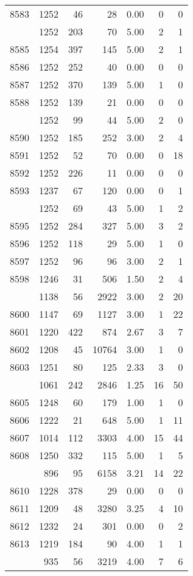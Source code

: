 \documentclass[
]{article}
\begin{document}
\begin{table}
\begin{tabular}[t]{lrrrrrr}
8583 & 1252 & 46 & 28 & 0.00 & 0 & 0\\
\addlinespace
8584 & 1252 & 203 & 70 & 5.00 & 2 & 1\\
8585 & 1254 & 397 & 145 & 5.00 & 2 & 1\\
8586 & 1252 & 252 & 40 & 0.00 & 0 & 0\\
8587 & 1252 & 370 & 139 & 5.00 & 1 & 0\\
8588 & 1252 & 139 & 21 & 0.00 & 0 & 0\\
\addlinespace
8589 & 1252 & 99 & 44 & 5.00 & 2 & 0\\
8590 & 1252 & 185 & 252 & 3.00 & 2 & 4\\
8591 & 1252 & 52 & 70 & 0.00 & 0 & 18\\
8592 & 1252 & 226 & 11 & 0.00 & 0 & 0\\
8593 & 1237 & 67 & 120 & 0.00 & 0 & 1\\
\addlinespace
8594 & 1252 & 69 & 43 & 5.00 & 1 & 2\\
8595 & 1252 & 284 & 327 & 5.00 & 3 & 2\\
8596 & 1252 & 118 & 29 & 5.00 & 1 & 0\\
8597 & 1252 & 96 & 96 & 3.00 & 2 & 1\\
8598 & 1246 & 31 & 506 & 1.50 & 2 & 4\\
\addlinespace
8599 & 1138 & 56 & 2922 & 3.00 & 2 & 20\\
8600 & 1147 & 69 & 1127 & 3.00 & 1 & 22\\
8601 & 1220 & 422 & 874 & 2.67 & 3 & 7\\
8602 & 1208 & 45 & 10764 & 3.00 & 1 & 0\\
8603 & 1251 & 80 & 125 & 2.33 & 3 & 0\\
\addlinespace
8604 & 1061 & 242 & 2846 & 1.25 & 16 & 50\\
8605 & 1248 & 60 & 179 & 1.00 & 1 & 0\\
8606 & 1222 & 21 & 648 & 5.00 & 1 & 11\\
8607 & 1014 & 112 & 3303 & 4.00 & 15 & 44\\
8608 & 1250 & 332 & 115 & 5.00 & 1 & 5\\
\addlinespace
8609 & 896 & 95 & 6158 & 3.21 & 14 & 22\\
8610 & 1228 & 378 & 29 & 0.00 & 0 & 0\\
8611 & 1209 & 48 & 3280 & 3.25 & 4 & 10\\
8612 & 1232 & 24 & 301 & 0.00 & 0 & 2\\
8613 & 1219 & 184 & 90 & 4.00 & 1 & 1\\
\addlinespace
8614 & 935 & 56 & 3219 & 4.00 & 7 & 6\\

\end{tabular}
\end{table}
\end{document}

